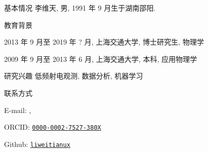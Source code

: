 
\begin{resume}
  \begin{resumesection}{基本情况}
    李维天, 男, 1991 年 9 月生于湖南邵阳.
  \end{resumesection}

  \begin{resumelist}{教育背景}
    \item 2013 年 9 月至 2019 年 ? 月, 上海交通大学, 博士研究生, 物理学
    \item 2009 年 9 月至 2013 年 6 月, 上海交通大学, 本科, 应用物理学
  \end{resumelist}

  \begin{resumesection}{研究兴趣}
    低频射电观测, 数据分析, 机器学习
  \end{resumesection}

  \begin{resumelist}{联系方式}
    \item E-mail:
      , \hspace{0.5em}
    \item ORCID:
      \href{https://orcid.org/0000-0002-7527-380X}{\texttt{0000-0002-7527-380X}}
    \item Github:
      \href{https://github.com/liweitianux}{\texttt{liweitianux}}
  \end{resumelist}
\end{resume}
